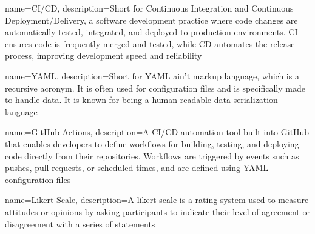 {
    name=CI/CD,
    description={Short for Continuous Integration and Continuous Deployment/Delivery, a software development practice where code changes are automatically tested, integrated, and deployed to production environments. CI ensures code is frequently merged and tested, while CD automates the release process, improving development speed and reliability}
}

{
    name=YAML,
    description={Short for YAML ain’t markup language, which is a recursive acronym. It is often used for configuration files and is specifically made to handle data. It is known for being a human-readable data serialization language}
}

{
    name=GitHub Actions,
    description={A CI/CD automation tool built into GitHub that enables developers to define workflows for building, testing, and deploying code directly from their repositories. Workflows are triggered by events such as pushes, pull requests, or scheduled times, and are defined using YAML configuration files}
}

{
    name=Likert Scale,
    description={A likert scale is a rating system used to measure attitudes or opinions by asking participants to indicate their level of agreement or disagreement with a series of statements}
}






